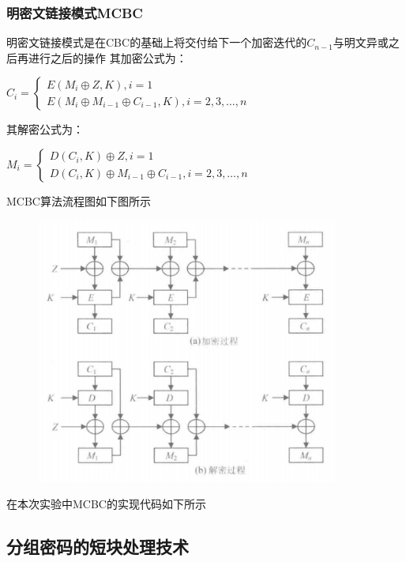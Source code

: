 \documentclass[a4paper,11pt,UTF8]{ctexart}
\newcommand{\bottomcaption}{%
\setlength{\abovecaptionskip}{6pt}%
\setlength{\belowcaptionskip}{6pt}%
\caption}
\newcommand{\xiaowuhao}{\fontsize{9pt}{\baselineskip}\selectfont}   %
\begin{document}
        \subsubsection{明密文链接模式MCBC}
            明密文链接模式是在CBC的基础上将交付给下一个加密迭代的$C_{n-1}$与明文异或之后再进行之后的操作
            其加密公式为：\par
            $C_{i}=\left\{\begin{matrix} E(M_{i}\oplus Z,K),i=1\\E(M_{i}\oplus M_{i-1}\oplus C_{i-1},K),i=2,3,\dots ,n\end{matrix}\right.$\par
            其解密公式为：\par
            $ M_{i}=\left\{\begin{matrix} D(C_{i},K)\oplus Z,i=1\\D(C_{i},K)\oplus M_{i-1}\oplus C_{i-1},i=2,3,\dots ,n\end{matrix}\right.$\par
            MCBC算法流程图如下图所示
            \begin{figure}[H]
                \centering
                \includegraphics[width=10cm]{MCBC.png}
                \bottomcaption{\xiaowuhao{MCBC加解密流程}}
            \end{figure}
            在本次实验中MCBC的实现代码如下所示
            

    \subsection{分组密码的短块处理技术}
\end{document}
